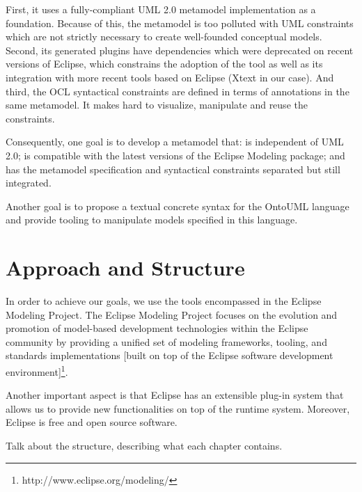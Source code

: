 \documentclass[
	10pt,				%
	oneside,
	a4paper,			%
	brazil,
	english
	]{abntex2}
\begin{document}
First, it uses a fully-compliant UML 2.0 metamodel implementation as a foundation.
Because of this, the metamodel is too polluted with UML constraints which are not
strictly necessary to create well-founded conceptual models.
%
Second, its generated plugins have dependencies which were deprecated on recent
versions of Eclipse, which constrains the adoption of the tool as well as its
integration with more recent tools based on Eclipse (Xtext in our case).
%
%
And third, the OCL syntactical constraints are defined in terms of annotations in
the same metamodel. It makes hard to visualize, manipulate and reuse the constraints.

Consequently, one goal is to develop a metamodel that: is independent of UML 2.0;
is compatible with the latest versions of the Eclipse Modeling package;
and has the metamodel specification and syntactical constraints separated but
still integrated.

Another goal is to propose a textual concrete syntax for the OntoUML language and
provide tooling to manipulate models specified in this language.
%

\section{Approach and Structure}

In order to achieve our goals, we use the tools encompassed in the Eclipse Modeling
Project. The Eclipse Modeling Project focuses on the evolution and promotion of
model-based development technologies
within the Eclipse community by providing a unified set of modeling frameworks,
tooling, and standards implementations [built on top of the Eclipse software
development environment]\footnote{http://www.eclipse.org/modeling/}.

Another important aspect is that Eclipse has an extensible plug-in system that
allows us to provide new functionalities on top of the runtime system.
Moreover, Eclipse is free and open source software.

Talk about the structure, describing what each chapter contains.
\end{document}
